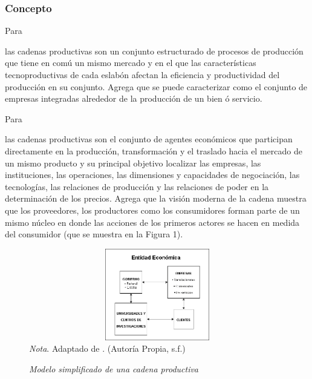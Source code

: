 \documentclass[stu, 12pt, letterpaper, donotrepeattitle, floatsintext, natbib]{apa7}
\begin{document}
\subsubsection{Concepto}
Para \begin{justifying}
    \cite{castro-2005}%
    las cadenas productivas son un conjunto estructurado de procesos de producción que tiene en comú un mismo mercado y en el que las características tecnoproductivas
    de cada eslabón afectan la eficiencia y productividad del producción en su conjunto. Agrega que se puede caracterizar como el conjunto de empresas
    integradas alrededor de la producción de un bien ó servicio.\par
\end{justifying}
Para \begin{justifying}
    \cite{tomta-2009} %
    las cadenas productivas son el conjunto de agentes económicos que participan directamente en la producción, transformación y el traslado hacia el mercado de un mismo producto y su principal
    objetivo localizar las empresas, las instituciones, las operaciones, las dimensiones y capacidades de negociación, las tecnologías, las relaciones de producción
    y las relaciones de poder en la determinación de los precios. Agrega que la visión moderna de la cadena muestra que los
    proveedores, los productores como los consumidores forman parte de un mismo núcleo en donde las acciones de los primeros actores se hacen en medida del consumidor (que se muestra en la Figura 1).\par %
\end{justifying}
\begin{figure}[H]
    \caption{\emph{Modelo simplificado de una cadena productiva\\}}
    \centering
    \smallskip
    \includegraphics[width=12cm,height=4cm]{modeloo_moderno.drawio.png}
    \bigskip
    \\\small\textit{Nota}. Adaptado de \cite{tomta-2009}. %
    (Autoría Propia, s.f.)
\end{figure}
\end{document}
